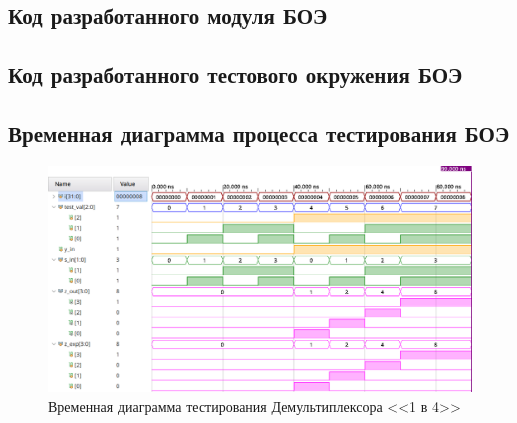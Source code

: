\subsection{Код разработанного модуля БОЭ}


\subsection{Код разработанного тестового окружения БОЭ}


\subsection{Временная диаграмма процесса тестирования БОЭ}
\begin{figure}[H]
	\centering
	\includegraphics[width=1\textwidth]{../data/test_boe_time_verilog.png}
	\caption{Временная диаграмма тестирования Демультиплексора <<1 в 4>>}
\end{figure}
